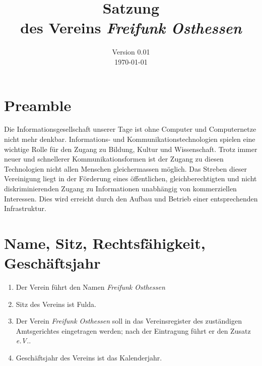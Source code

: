 \documentclass[ngerman]{article}
\title{Satzung\\
des Vereins \emph{Freifunk Osthessen}}
\date{Version 0.01\\
\today}
\begin{document}
\maketitle

\thispagestyle{empty}
\pagebreak

\section{Preamble}
Die Informationsgesellschaft unserer Tage ist ohne Computer und Computernetze nicht mehr denkbar.
Informations- und Kommunikationstechnologien spielen eine wichtige Rolle für den Zugang zu Bildung, Kultur und Wissenschaft.
Trotz immer neuer und schnellerer Kommunikationsformen ist der Zugang zu diesen Technologien nicht allen Menschen gleichermassen möglich.
Das Streben dieser Vereinigung liegt in der Förderung eines öffentlichen, gleichberechtigten und nicht diskriminierenden Zugang zu Informationen unabhängig von kommerziellen Interessen.
Dies wird erreicht durch den Aufbau und Betrieb einer entsprechenden Infrastruktur.

\section{Name, Sitz, Rechtsfähigkeit, Geschäftsjahr}
\begin{enumerate}
\item Der Verein führt den Namen \emph{Freifunk Osthessen}
\item Sitz des Vereins ist Fulda.
\item Der Verein \emph{Freifunk Osthessen} soll in das Vereinsregister des zuständigen Amtsgerichtes eingetragen werden; nach der Eintragung führt er den Zusatz \emph{e.V.}.
\item Geschäftsjahr des Vereins ist das Kalenderjahr.
\end{enumerate}
\end{document}
